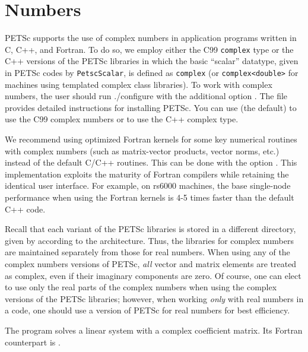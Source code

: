 {{%
\section{
 Numbers}  \label{sec_complex}

PETSc supports the use of complex numbers in application programs
written in C, C++, and Fortran.  To do so, we employ either the C99 \lstinline{complex} type or the C++ versions of
the PETSc libraries in which the basic ``scalar'' datatype, given in
PETSc codes by \lstinline{PetscScalar}, is defined as \lstinline{complex} (or \lstinline{complex<double>}
 for machines using templated complex class
libraries).  To work with complex numbers,
the user should run ./configure with the additional option .
The file \href{https://www.mcs.anl.gov/petsc/documentation/installation.html}{}
provides detailed instructions for installing PETSc. 
You can use  (the default) to use the C99 complex numbers or  to use the C++ complex type. 

We recommend using optimized Fortran kernels for some key numerical
routines with complex numbers (such as matrix-vector products, vector
norms, etc.) instead of the default C/C++ routines.  This can be done with the   option .
This implementation exploits the
maturity of Fortran compilers while retaining the identical user
interface.  For example, on rs6000 machines, the base single-node
performance when using the Fortran kernels is 4-5 times faster than
the default C++ code.


Recall that each variant of the PETSc libraries is stored in a
different directory, given by
according to the architecture. Thus, the
libraries for complex
numbers are maintained separately from those for real
numbers.  When using any of the complex numbers versions of PETSc,
{\em all} vector and matrix elements are treated as complex,
even if their imaginary components are zero.
Of course, one can elect to use only the real parts of the complex
numbers when using the complex versions of the PETSc libraries;
however, when working {\em only} with real numbers in a code,
one should use a version of PETSc for real numbers for best efficiency.

The program \href{http://www.mcs.anl.gov/petsc/petsc-current/src/ksp/ksp/examples/tutorials/ex11.c.html}{}
solves a linear system with a complex
coefficient matrix.  Its Fortran counterpart is
\href{http://www.mcs.anl.gov/petsc/petsc-current/src/ksp/ksp/examples/tutorials/ex11f.F.html}{}.

}}
